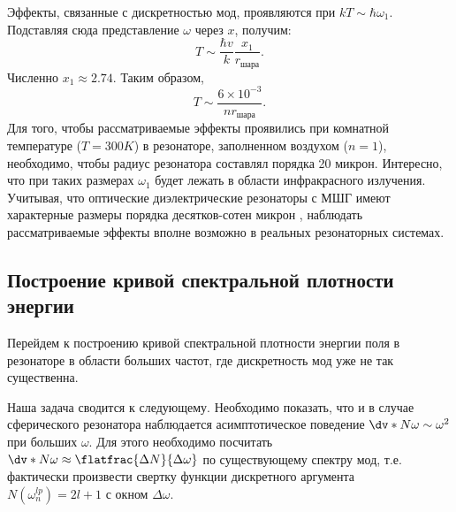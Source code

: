     Эффекты, связанные с дискретностью мод, проявляются при $kT \sim \hbar \omega_1$. Подставляя сюда представление $\omega$ через $x$, получим:
    \begin{equation}
        T \sim \frac{\hbar v}{k} \frac{x_1}{r_\text{шара}} .
    \end{equation}
    Численно $x_1 \approx 2.74$. Таким образом,
    \begin{equation}
        T \sim \frac{6 \times 10^{-3}}{n r_\text{шара}} .
    \end{equation}
    Для того, чтобы рассматриваемые эффекты проявились при комнатной температуре ($T = 300K$) в резонаторе, заполненном воздухом ($n = 1$), необходимо, чтобы радиус резонатора составлял порядка 20 микрон. Интересно, что при таких размерах $\omega_1$ будет лежать в области инфракрасного излучения. Учитывая, что оптические диэлектрические резонаторы с МШГ имеют характерные размеры порядка десятков-сотен микрон \cite{microresonators}, наблюдать рассматриваемые эффекты вполне возможно в реальных резонаторных системах.

%
%
%
%
%
%

\subsection{Построение кривой спектральной плотности энергии}

    Перейдем к построению кривой спектральной плотности энергии поля в резонаторе в области больших частот, где дискретность мод уже не так существенна.

    Наша задача сводится к следующему. Необходимо показать, что и в случае сферического резонатора наблюдается асимптотическое поведение $\dv*{N}{\omega} \sim \omega^2$ при больших $\omega$. Для этого необходимо посчитать $\dv*{N}{\omega} \approx \flatfrac{\Delta N}{\Delta \omega}$ по существующему спектру мод, т.е. фактически произвести свертку функции дискретного аргумента $N(\omega^{lp}_n) = 2l + 1$ с окном $\Delta \omega$.

